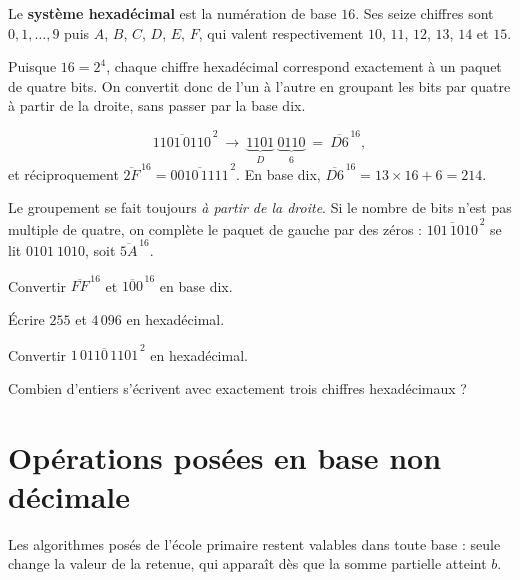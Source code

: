 \begin{definition}
Le \textbf{système hexadécimal} est la numération de base $16$. Ses seize
chiffres sont $0,1,\dots,9$ puis $A$, $B$, $C$, $D$, $E$, $F$, qui valent
respectivement $10$, $11$, $12$, $13$, $14$ et $15$.
\end{definition}

\begin{propriete}
Puisque $16 = 2^{4}$, chaque chiffre hexadécimal correspond exactement à un
paquet de quatre bits. On convertit donc de l'un à l'autre en groupant les
bits par quatre à partir de la droite, sans passer par la base dix.
\end{propriete}

\begin{exemple}
\[
  \overline{1101\,0110}^{\,2}
  \ \longrightarrow\ \underbrace{1101}_{D}\ \underbrace{0110}_{6}
  \ =\ \overline{D6}^{\,16},
\]
et réciproquement $\overline{2F}^{\,16} = \overline{0010\,1111}^{\,2}$. En
base dix, $\overline{D6}^{\,16} = 13\times16+6 = 214$.
\end{exemple}

\begin{avertissement}
Le groupement se fait toujours \emph{à partir de la droite}. Si le nombre de
bits n'est pas multiple de quatre, on complète le paquet de gauche par des
zéros : $\overline{101\,1010}^{\,2}$ se lit $0101\ 1010$, soit
$\overline{5A}^{\,16}$.
\end{avertissement}

\begin{entrainement}[hexadécimal]
\exo[\niveau{1}] Convertir $\overline{FF}^{\,16}$ et $\overline{100}^{\,16}$
en base dix.

\exo[\niveau{1}] Écrire $255$ et $4\,096$ en hexadécimal.

\exo[\niveau{2}] Convertir $\overline{1\,0110\,1101}^{\,2}$ en hexadécimal.

\exo[\niveau{3}] Combien d'entiers s'écrivent avec exactement trois chiffres
hexadécimaux ?
\end{entrainement}

\section{Opérations posées en base non décimale}

\begin{propriete}
Les algorithmes posés de l'école primaire restent valables dans toute base :
seule change la valeur de la retenue, qui apparaît dès que la somme partielle
atteint $b$.
\end{propriete}

